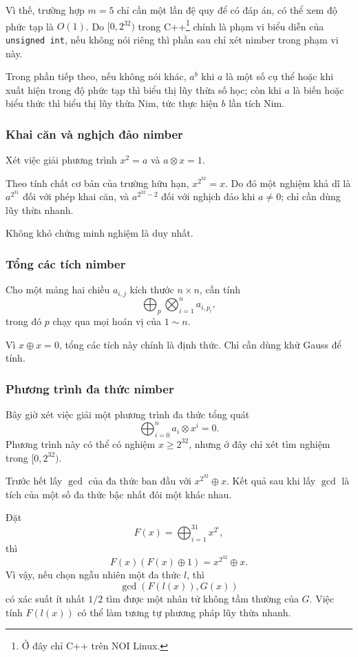 \documentclass[11pt]{article}
\begin{document}
Vì thế, trường hợp \(m=5\) chỉ cần một lần đệ quy để có đáp án, có thể xem độ
phức tạp là \(O(1)\). Do \([0,2^{32})\) trong C++\footnote{Ở đây chỉ C++ trên
NOI Linux.} chính là phạm vi biểu diễn của \texttt{unsigned int}, nếu không nói
riêng thì phần sau chỉ xét nimber trong phạm vi này.

Trong phần tiếp theo, nếu không nói khác, \(a^b\) khi \(a\) là một số cụ thể
hoặc khi xuất hiện trong độ phức tạp thì biểu thị lũy thừa số học; còn khi
\(a\) là biến hoặc biểu thức thì biểu thị lũy thừa Nim, tức thực hiện \(b\) lần
tích Nim.

\subsubsection{Khai căn và nghịch đảo nimber}

Xét việc giải phương trình \(x^2=a\) và \(a\otimes x=1\).

Theo tính chất cơ bản của trường hữu hạn, \(x^{2^{32}}=x\). Do đó một nghiệm khả
dĩ là \(a^{2^{31}}\) đối với phép khai căn, và \(a^{2^{32}-2}\) đối với nghịch
đảo khi \(a\ne 0\); chỉ cần dùng lũy thừa nhanh.

Không khó chứng minh nghiệm là duy nhất.

\subsubsection{Tổng các tích nimber}

Cho một mảng hai chiều \(a_{i,j}\) kích thước \(n\times n\), cần tính
\[
  \bigoplus_p \bigotimes_{i=1}^n a_{i,p_i},
\]
trong đó \(p\) chạy qua mọi hoán vị của \(1\sim n\).

Vì \(x\oplus x=0\), tổng các tích này chính là định thức. Chỉ cần dùng khử
Gauss để tính.

\subsubsection{Phương trình đa thức nimber}

Bây giờ xét việc giải một phương trình đa thức tổng quát
\[
  \bigoplus_{i=0}^n a_i\otimes x^i=0.
\]
Phương trình này có thể có nghiệm \(x\ge 2^{32}\), nhưng ở đây chỉ xét tìm
nghiệm trong \([0,2^{32})\).

Trước hết lấy \(\gcd\) của đa thức ban đầu với \(x^{2^{32}}\oplus x\). Kết quả
sau khi lấy \(\gcd\) là tích của một số đa thức bậc nhất đôi một khác nhau.

Đặt
\[
  F(x)=\bigoplus_{i=1}^{31} x^{2^i},
\]
thì
\[
  F(x)(F(x)\oplus 1)=x^{2^{32}}\oplus x.
\]
Vì vậy, nếu chọn ngẫu nhiên một đa thức \(l\), thì
\[
  \gcd(F(l(x)),G(x))
\]
có xác suất ít nhất \(1/2\) tìm được một nhân tử không tầm thường của \(G\). Việc
tính \(F(l(x))\) có thể làm tương tự phương pháp lũy thừa nhanh.
\end{document}
